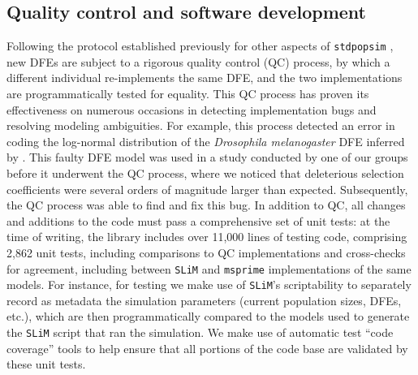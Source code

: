 \documentclass[hidelinks]{article}
\newcommand{\stdpopsim}{\texttt{stdpopsim}\xspace}
\newcommand{\slim}{\texttt{SLiM}\xspace}
\newcommand{\msprime}{\texttt{msprime}\xspace}
\begin{document}
    \subsection*{Quality control and software development}
    Following the protocol established previously for other aspects of \stdpopsim{} \citep{adrion2020community},
    new DFEs are subject to a rigorous quality control (QC) process,
    by which a different individual re-implements the same DFE, and the two implementations
    are programmatically tested for equality.
    This QC process has proven its effectiveness on numerous occasions in detecting implementation bugs
    and resolving modeling ambiguities.
    For example, this process detected  an error in coding the log-normal distribution of
    the \textit{Drosophila melanogaster} DFE inferred by \citet[\stdpopsim label \texttt{LognormalPlusPositive\_R16}]{booker2021selective}.
    This faulty DFE model was used in a study conducted by one of our groups before it underwent the QC process,
    where we noticed that deleterious selection coefficients
    were several orders of magnitude larger than expected.
    Subsequently, the QC process was able to find and fix this bug.
    In addition to QC, all changes and additions to the code must pass a comprehensive set of unit tests:
    at the time of writing, the library includes over 11,000 lines of testing code,
    comprising 2,862 unit tests, including comparisons to QC implementations
    and cross-checks for agreement, including between \slim and \msprime implementations of the same models.
    For instance, for testing we make use of \slim's scriptability to separately record as metadata
    the simulation parameters (current population sizes, DFEs, etc.),
    which are then programmatically compared to the models used to generate the \slim script
    that ran the simulation.
    We make use of automatic test ``code coverage'' tools to help ensure that all portions of the code base
    are validated by these unit tests.
\end{document}
